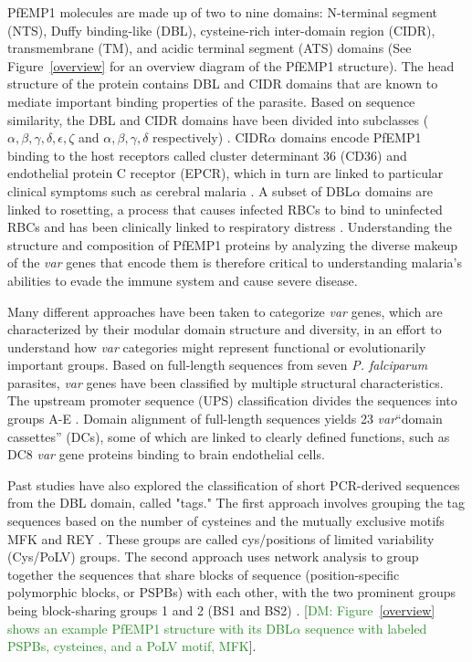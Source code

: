\documentclass[10pt,twocolumn,superscriptaddress]{revtex4-1}
\newcommand{\dieumycom}[1]{[\textcolor{ForestGreen}{DM: #1}]}
\newcommand{\var}{{\it var}\xspace}
\newcommand{\pf}{{\it P. falciparum}\xspace}
\newcommand{\pfem}{{PfEMP1}\xspace}
\newcommand{\dbla}{{DBL$\alpha$}\xspace}
\newcommand{\cidra}{{CIDR$\alpha$}\xspace}
\newcommand{\cp}{{Cys/PoLV}\xspace}
\begin{document}
PfEMP1 molecules are made up of two to nine domains: N-terminal segment (NTS), Duffy binding-like (DBL), cysteine-rich inter-domain region (CIDR), transmembrane (TM), and acidic terminal segment (ATS) domains \cite{rask2010} (See Figure~\ref{overview} for an overview diagram of the \pfem structure). The head structure of the protein contains DBL and CIDR domains that are known to mediate important binding properties of the parasite. Based on sequence similarity, the DBL and CIDR domains have been divided into subclasses ($\alpha, \beta, \gamma, \delta, \epsilon , \zeta$ and $\alpha, \beta, \gamma, \delta$ respectively) \cite{rask2010} . \cidra domains encode PfEMP1 binding to the host receptors called cluster determinant 36 (CD36) and endothelial protein C receptor (EPCR), which in turn are linked to particular clinical symptoms such as cerebral malaria \cite{hsieh2016}. A subset of \dbla domains are linked to rosetting, a process that causes infected RBCs to bind to uninfected RBCs and has been clinically linked to respiratory distress \cite{lau2015}. Understanding the structure and composition of PfEMP1 proteins by analyzing the diverse makeup of the \var genes that encode them is therefore critical to understanding malaria's abilities to evade the immune system and cause severe disease. 

Many different approaches have been taken to categorize \var genes, which are characterized by their modular domain structure and diversity, in an effort to understand how \var categories might represent functional or evolutionarily important groups. Based on full-length sequences from seven \pf parasites, \var genes have been classified by multiple structural characteristics. The upstream promoter sequence (UPS) classification divides the sequences into groups A-E \cite{rask2010, vazquez2002}. Domain alignment of full-length sequences yields 23 \var ``domain cassettes'' (DCs), some of which are linked to clearly defined functions, such as DC8 \var gene proteins binding to brain endothelial cells. 

Past studies have also explored the classification of short PCR-derived sequences from the DBL domain, called "tags." The first approach involves grouping the tag sequences based on the number of cysteines and the mutually exclusive motifs MFK and REY \cite{bull2007}. These groups are called cys/positions of limited variability (\cp) groups. The second approach uses network analysis to group together the sequences that share blocks of sequence (position-specific polymorphic blocks, or PSPBs) with each other, with the two prominent groups being block-sharing groups 1 and 2 (BS1 and BS2) \cite{bull2008}. \dieumycom{Figure~\ref{overview} shows an example \pfem structure with its \dbla sequence with labeled PSPBs, cysteines, and a PoLV motif, MFK}.
\end{document}
